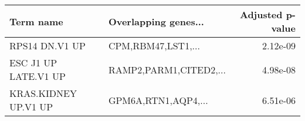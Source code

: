 \begin{tabular}{llr}
\toprule
           Term name &   Overlapping genes... &  Adjusted p-value \\
\midrule
      RPS14 DN.V1 UP &     CPM,RBM47,LST1,... &          2.12e-09 \\
ESC J1 UP LATE.V1 UP & RAMP2,PARM1,CITED2,... &          4.98e-08 \\
KRAS.KIDNEY UP.V1 UP &    GPM6A,RTN1,AQP4,... &          6.51e-06 \\
\bottomrule
\end{tabular}
